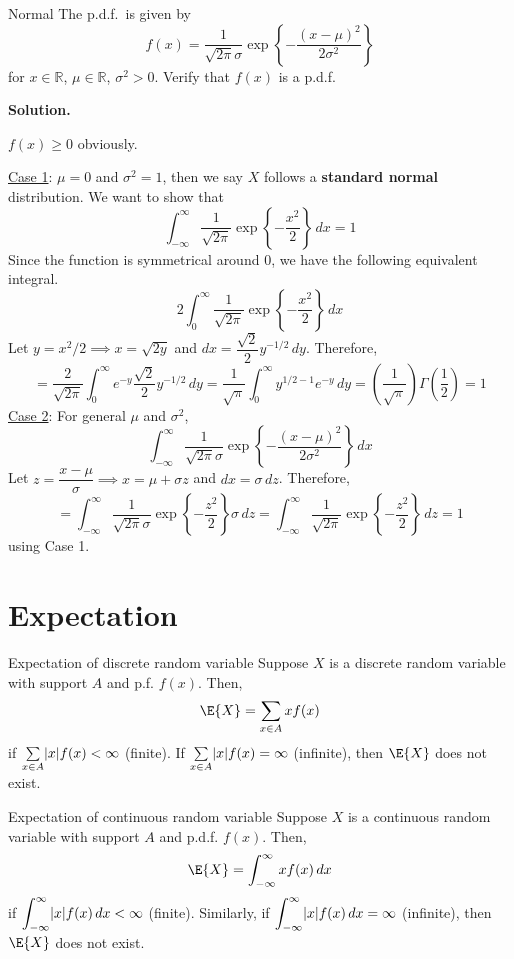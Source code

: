 \begin{Example}{Normal}{}
    The p.d.f.\ is given by
    \[ f(x)=\frac{1}{\sqrt{2\pi}\sigma}\exp\left\{ -\frac{(x-\mu)^2}{2\sigma^2} \right\}  \]
    for $ x\in\mathbb{R} $, $ \mu\in\mathbb{R} $, $ \sigma^2>0 $.
    Verify that $ f(x) $ is a p.d.f.

    \textbf{Solution.}

    $ f(x)\ge 0 $ obviously.

    \underline{Case 1}: $ \mu=0 $ and $ \sigma^2=1 $, then
    we say $ X $ follows a \textbf{standard normal} distribution.
    We want to show that
    \[ \int_{-\infty}^{\infty} \frac{1}{\sqrt{2\pi}}\exp\left\{ -\frac{x^2}{2} \right\} \, d{x}=1  \]
    Since the function is symmetrical around 0, we have the following equivalent integral.
    \[ 2\int_{0}^{\infty} \frac{1}{\sqrt{2\pi}}\exp\left\{ -\frac{x^2}{2} \right\} \, d{x}  \]
    Let $ y=x^2/2\implies x=\sqrt{2y} $
    and $ dx=\dfrac{\sqrt{2}}{2} y^{-1/2}\,dy $. Therefore,
    \[ =\frac{2}{\sqrt{2\pi}}\int_{0}^{\infty} e^{-y}\frac{\sqrt{2}}{2} y^{-1/2}\, d{y}
        =\frac{1}{\sqrt{\pi}}\int_{0}^{\infty} y^{1/2-1}e^{-y}\, d{y}=
        \left( \frac{1}{\sqrt{\pi}}  \right)\Gamma\left( \frac{1}{2} \right)=1    \]
    \underline{Case 2}: For general $ \mu $ and $ \sigma^2 $,
    \[ \int_{-\infty}^{\infty}  \frac{1}{\sqrt{2\pi}\sigma}\exp\left\{ -\frac{(x-\mu)^2}{2\sigma^2} \right\} \, d{x} \]
    Let $ z=\dfrac{x-\mu}{\sigma}\implies x=\mu+\sigma z  $
    and $ dx=\sigma\,dz $. Therefore,
    \[ =\int_{-\infty}^{\infty} \frac{1}{\sqrt{2\pi}\sigma}
        \exp\left\{ -\frac{z^2}{2}\right\}\sigma \, d{z}=
        \int_{-\infty}^{\infty} \frac{1}{\sqrt{2\pi}}\exp\left\{ -\frac{z^2}{2} \right\} \, d{z}=1   \]
    using Case 1.
\end{Example}
\section{Expectation}
\begin{Definition}{Expectation of discrete random variable}{}
    Suppose $ X $ is a discrete random variable with support
    $ A $ and p.f. $ f(x) $. Then,
    \[ \E{X}=\sum\limits_{x\in A}x f(x)  \]
    if $ \sum\limits_{x\in A}\lvert x\rvert f(x) < \infty $ (finite).
    If $ \sum\limits_{x\in A}\lvert x\rvert f(x) =\infty $ (infinite), then
    $ \E{X} $ does not exist.
\end{Definition}

\begin{Definition}{Expectation of continuous random variable}{}
    Suppose $ X $ is a continuous random variable with support $ A $
    and p.d.f. $ f(x) $. Then,
    \[ \E{X}=\int_{-\infty}^{\infty} x f(x)\, d{x}  \]
    if $ \displaystyle \int_{-\infty}^{\infty} \lvert x\rvert f(x)\, d{x} <\infty $
    (finite). Similarly,
    if $ \displaystyle \int_{-\infty}^{\infty} \lvert x\rvert f(x)\, d{x} =\infty $
    (infinite),
    then $ \E{X} $ does not exist.
\end{Definition}

